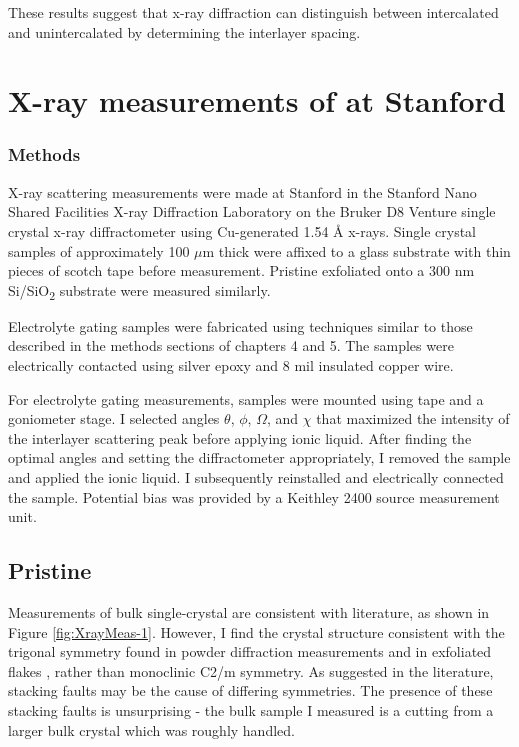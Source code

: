 These results suggest that x-ray diffraction can distinguish between intercalated and unintercalated \rucl by determining the interlayer spacing.

\section{X-ray measurements of \rucl at Stanford} 

\subsubsection{Methods}
X-ray scattering measurements were made at Stanford in the Stanford Nano Shared Facilities X-ray Diffraction Laboratory on the Bruker D8 Venture single crystal x-ray diffractometer using Cu-generated 1.54 \AA{} x-rays. Single crystal samples of \rucl approximately 100 $\mu$m thick were affixed to a glass substrate with thin pieces of scotch tape before measurement. Pristine \rucl exfoliated onto a 300 nm Si/SiO\textsubscript{2} substrate were measured similarly.

Electrolyte gating samples were fabricated using techniques similar to those described in the methods sections of chapters 4 and 5. The samples were electrically contacted using silver epoxy and 8 mil insulated copper wire.

For electrolyte gating measurements, samples were mounted using tape and a goniometer stage. I selected angles $\theta$, $\phi$, $\Omega$, and $\chi$ that maximized the intensity of the interlayer scattering peak before applying ionic liquid. After finding the optimal angles and setting the diffractometer appropriately, I removed the sample and applied the ionic liquid. I subsequently reinstalled and electrically connected the sample. Potential bias was provided by a Keithley 2400 source measurement unit.

\subsection{Pristine \rucl}

Measurements of bulk single-crystal \rucl are consistent with literature, as shown in Figure \ref{fig:XrayMeas-1}. However, I find the crystal structure consistent with the trigonal symmetry found in powder diffraction measurements  \cite{Fletcher1967} and in exfoliated flakes \cite{Gronke2018}, rather than monoclinic C2/m symmetry. As suggested in the literature, stacking faults may be the cause of differing symmetries. The presence of these stacking faults is unsurprising - the bulk sample I measured is a cutting from a larger bulk crystal which was roughly handled.

